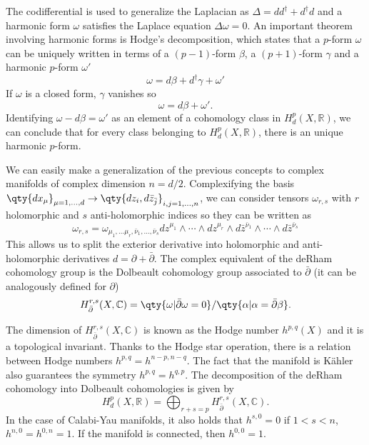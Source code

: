 The codifferential is used to generalize the Laplacian as $\Delta = dd^\dagger+d^\dagger d$ and
a harmonic form $\omega$ satisfies the Laplace equation $\Delta \omega=0$.
An important theorem involving harmonic forms is Hodge's decomposition, which states 
that a  $p$-form $\omega$ can be uniquely written in terms of a $(p-1)$-form $\beta$, 
a $(p+1)$-form $\gamma$ and a harmonic $p$-form $\omega'$
\begin{equation}
  \omega = d\beta + d^\dagger \gamma +\omega'
\end{equation}
If $\omega$ is a closed form, $\gamma$ vanishes so
\begin{equation}
  \omega = d\beta + \omega'.
\end{equation}
Identifying $\omega - d\beta= \omega'$ as an element of a cohomology class in $H_d^p(X,\mathbb R)$,
we can conclude that for every class belonging to $H_d^p(X,\mathbb R)$, there is an unique
harmonic $p$-form.

We can easily make a generalization of the previous concepts to complex manifolds of complex dimension $n=d/2$.
Complexifying the basis $\qty{dx_{\mu}}_{\mu=1,\ldots,d} \to  \qty{dz_i,d\bar z_{\bar j}}_{i,j=1,\ldots,n}$,
we can consider tensors $\omega_{r,s}$ with $r$ holomorphic and $s$ anti-holomorphic indices so they can be written as 
\begin{equation}
  \omega_{r,s} = \omega_{\mu_1,\ldots\mu_r,\bar \nu_1,\ldots,\bar \nu_s} dz^{\mu_1}\wedge\cdots\wedge dz^{\mu_r}\wedge d\bar z^{\bar \nu_1}\wedge
  \cdots\wedge d\bar z^{\bar \nu_s}
\end{equation}
This allows us to split the exterior derivative into holomorphic and anti-holomorphic derivatives $d=\partial+\bar\partial$. 
The complex equivalent of the deRham cohomology group is the Dolbeault cohomology group associated to $\bar \partial$ (it can be analogously defined for $\partial$)
\begin{equation}
  H^{r,s}_{\bar \partial }(X,\mathbb C)=\qty {\omega | \bar \partial \omega= 0}/\qty{\alpha|\alpha=\bar\partial \beta}.
\end{equation}

The dimension of $H^{r,s}_{\bar \partial }(X,\mathbb C)$ is known as the Hodge number $h^{p,q}(X)$ and it is a topological invariant.
Thanks to the Hodge star operation, there is a relation between Hodge numbers $h^{p,q}=h^{n-p,n-q}$.
The fact that the manifold is Kähler also guarantees the symmetry $h^{p,q}=h^{q,p}$.
The decomposition of the deRham cohomology into Dolbeault cohomologies is given by
\begin{equation}
  H_d^p(X,\mathbb R)=\bigoplus_{r+s=p} H_{\bar \partial}^{r,s}(X,\mathbb C).
\end{equation}
In the case of Calabi-Yau manifolds, it also holds that $h^{s,0}=0$ if $1<s<n$, $h^{n,0}=h^{0,n}=1$.
If the manifold is connected, then $h^{0,0}=1$.

